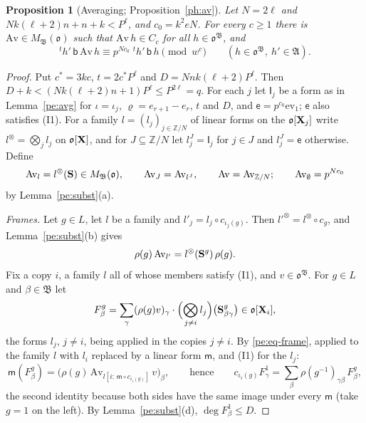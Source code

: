 \documentclass[10pt]{amsart}
\newtheorem{proposition}[theorem]{Proposition}
\theoremstyle{definition}
\theoremstyle{remark}
\newcommand{\Z}{\mathbb Z}
\providecommand{\pao}{\mathfrak o}
\providecommand{\phA}{\mathfrak A}
\providecommand{\phB}{\mathfrak B}
\begin{document}
\begin{proposition}[Averaging; Proposition~\ref{ph:av}]\label{pe:av}
Let $N=2\ell$ and $Nk(\ell+2)n+n+k<P^\ell$, and $c_0=k^2eN$. For every $c\ge1$ there is
$\mathrm{Av}\in M_\phB(\pao)$ such that $\mathrm{Av}\,h\in C_c$ for all $h\in\pao^\phB$, and
\[
{}^th'\,\mathsf b\,\mathrm{Av}\,h\equiv p^{Nc_0}\;{}^th'\,\mathsf b\,h\pmod{w^c}\qquad(h\in
\pao^\phB,\ h'\in\phA).
\]
\end{proposition}
\begin{proof}
Put $c^*=3kc$, $t=2c^*P^\ell$ and $D=Nnk(\ell+2)P^\ell$. Then $D+k<(Nk(\ell+2)n+1)P^\ell\le
P^{2\ell}=q$. For each $j$ let $\mathsf I_j$ be a form as in Lemma~\ref{pe:avg} for $\iota=
\iota_j$, $\varrho=e_{r+1}-e_r$, $t$ and $D$, and $\mathsf e=p^{c_0}\mathrm{ev}_1$; $\mathsf e$
also satisfies (I1). For a family $l=(l_j)_{j\in\Z/N}$ of linear forms on the $\pao[\peX_j]$ write
$l^\otimes=\bigotimes_jl_j$ on $\pao[\peX]$, and for $J\subseteq\Z/N$ let $l^J_j=\mathsf I_j$ for
$j\in J$ and $l^J_j=\mathsf e$ otherwise. Define
\[
\mathrm{Av}_l=l^\otimes(\peS)\in M_\phB(\pao),\qquad\mathrm{Av}_J=\mathrm{Av}_{l^J},\qquad
\mathrm{Av}=\mathrm{Av}_{\Z/N};\qquad\mathrm{Av}_\emptyset=p^{Nc_0}
\]
by Lemma~\ref{pe:subst}(a).

\emph{Frames.} Let $g\in L$, let $l$ be a family and $l'_j=l_j\circ c_{\iota_j(g)}$. Then
$l'^{\otimes}=l^\otimes\circ c_g$, and Lemma~\ref{pe:subst}(b) gives
\begin{equation}\label{pe:eq-frame}
\rho(g)\,\mathrm{Av}_{l'}=l^\otimes(\mathbf S^g)\,\rho(g).
\end{equation}
Fix a copy $i$, a family $l$ all of whose members satisfy (I1), and $v\in\pao^\phB$. For $g\in L$
and $\beta\in\phB$ let
\[
F^g_\beta=\sum_{\gamma}(\rho(g)v)_\gamma\cdot\Bigl(\bigotimes_{j\ne i}l_j\Bigr)\bigl(\peS^g_{\beta
\gamma}\bigr)\in\pao[\peX_i],
\]
the forms $l_j$, $j\ne i$, being applied in the copies $j\ne i$. By \eqref{pe:eq-frame}, applied
to the family $l$ with $l_i$ replaced by a linear form $\mathsf m$, and (I1) for the $l_j$:
\begin{equation}\label{pe:eq-m}
\mathsf m(F^g_\beta)=\bigl(\rho(g)\,\mathrm{Av}_{l[i:\,\mathsf m\circ c_{\iota_i(g)}]}\,v\bigr)_\beta,
\qquad\text{hence}\qquad c_{\iota_i(g)}F^1_\gamma=\sum_\beta\rho(g^{-1})_{\gamma\beta}\,F^g_\beta ,
\end{equation}
the second identity because both sides have the same image under every $\mathsf m$ (take $g=1$ on
the left). By Lemma~\ref{pe:subst}(d), $\deg F^1_\beta\le D$.


\end{proof}
\end{document}
